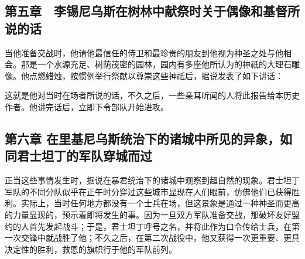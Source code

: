 \subsection{第五章　李锡尼乌斯在树林中献祭时关于偶像和基督所说的话}

当他准备交战时，他请他最信任的侍卫和最珍贵的朋友到他视为神圣之处与他相会。那是一个水源充足、树荫茂密的园林，园内有多座他所认为的神祇的大理石雕像。他点燃蜡烛，按惯例举行祭献以尊崇这些神祇后，据说发表了如下讲话：\par

\par

这就是他对当时在场者所说的话，不久之后，一些亲耳听闻的人将此报告给本历史作者。他讲完话后，立即下令部队开始进攻。\par


\subsection{第六章 在里基尼乌斯统治下的诸城中所见的异象，如同君士坦丁的军队穿城而过}

正当这些事情发生时，据说在暴君统治下的诸城中观察到超自然的现象。君士坦丁军队的不同分队似乎在正午时分穿过这些城市显现在人们眼前，仿佛他们已获得胜利。实际上，当时任何地方都没有一个士兵在场，但这景象是通过一种神圣而更高的力量显现的，预示着即将发生的事。因为一旦双方军队准备交战，那破坏友好盟约的人首先发起战斗；于是，君士坦丁呼号之名，并将此作为口令传给士兵，在第一次交锋中就战胜了他；不久之后，在第二次战役中，他又获得一次更重要、更具决定性的胜利，救恩的旗帜行于他的军队前列。\par

